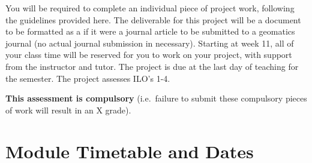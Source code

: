 \documentclass[
]{book}
\let\BeginKnitrBlock\begin \let\EndKnitrBlock\end
\begin{document}
You will be required to complete an individual piece of project work, following the guidelines provided here. The deliverable for this project will be a document to be formatted as a if it were a journal article to be submitted to a geomatics journal (no actual journal submission in necessary). Starting at week 11, all of your class time will be reserved for you to work on your project, with support from the instructor and tutor. The project is due at the last day of teaching for the semester. The project assesses ILO's 1-4.

\BeginKnitrBlock{rmdimportant}
\textbf{This assessment is compulsory} (i.e.~failure to submit these compulsory pieces of work will
result in an X grade).
\EndKnitrBlock{rmdimportant}

\hypertarget{module-timetable-and-dates}{%
\section{Module Timetable and Dates}\label{module-timetable-and-dates}}
\end{document}
